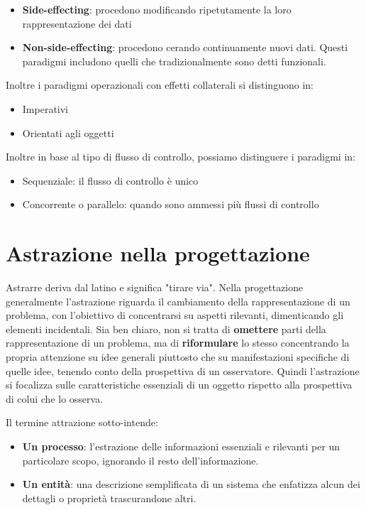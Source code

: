 \documentclass[a4paper,18pt]{extarticle}
\begin{document}
\begin{itemize}
  \item \textbf{Side-effecting}: procedono modificando ripetutamente la loro rappresentazione dei dati
  \item \textbf{Non-side-effecting}: procedono cerando continuamente nuovi dati. Questi paradigmi includono quelli che tradizionalmente sono detti funzionali.
\end{itemize}

Inoltre i paradigmi operazionali con effetti collaterali si distinguono in:

\begin{itemize}
  \item Imperativi
  \item Orientati agli oggetti
\end{itemize}

Inoltre in base al tipo di flusso di controllo, possiamo distinguere i paradigmi in:
\begin{itemize}
  \item Sequenziale: il flusso di controllo è unico
  \item Concorrente o parallelo: quando sono ammessi più flussi di controllo
\end{itemize}

\newpage

\section{ Astrazione nella progettazione}

Astrarre deriva dal latino e significa "tirare via". Nella progettazione generalmente l'astrazione riguarda il cambiamento della rappresentazione di un problema, con l'obiettivo di concentrarsi su aspetti rilevanti, dimenticando gli elementi incidentali. Sia ben chiaro, non si tratta di \textbf{omettere} parti della rappresentazione di un problema, ma di \textbf{riformulare} lo stesso concentrando la propria attenzione su idee generali piuttosto che su manifestazioni specifiche di quelle idee, tenendo conto della prospettiva di un osservatore. Quindi l'astrazione si focalizza sulle caratteristiche essenziali di un oggetto rispetto alla prospettiva di colui che lo osserva.

Il termine attrazione sotto-intende:
\begin{itemize}
  \item \textbf{Un processo}: l'estrazione delle informazioni essenziali e rilevanti per un particolare scopo, ignorando il resto dell'informazione.
  \item \textbf{Un entità}: una descrizione semplificata di un sistema che enfatizza alcun dei dettagli o proprietà trascurandone altri.
\end{itemize}
\end{document}
